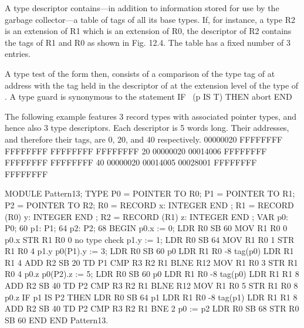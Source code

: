 A type descriptor contains---in addition to information stored for use by the garbage collector---a table of tags of all its base types. If, for instance, a type R2 is an extension of R1 which is an extension of R0, the descriptor of R2 contains the tags of R1 and R0 as shown in Fig. 12.4. The table has a fixed number of 3 entries.

A type test of the form  then, consists of a comparison of the type tag of  at address  with the tag held in the descriptor of  at the extension level of the type of . A type guard  is synonymous to the statement
\begintt
IF ~(p IS T) THEN abort END
\endtt


\noindent The following example features 3 record types with associated pointer types, and hence also 3 type descriptors. Each descriptor is 5 words long. Their addresses, and therefore their tags, are 0, 20, and 40 respectively.
 00000020 FFFFFFFF FFFFFFFF FFFFFFFF FFFFFFFF
    20 00000020 00014006 FFFFFFFF FFFFFFFF FFFFFFFF
    40 00000020 00014005 00028001 FFFFFFFF FFFFFFFF

MODULE Pattern13;
  TYPE
    P0 = POINTER TO R0;
    P1 = POINTER TO R1;
    P2 = POINTER TO R2;
    R0 = RECORD x: INTEGER END ;
    R1 = RECORD (R0) y: INTEGER END ;
    R2 = RECORD (R1) z: INTEGER END ;
  VAR
    p0: P0;                      60
    p1: P1;                      64
    p2: P2;                      68
  BEGIN
    p0.x := 0;         LDR  R0 SB 60
                       MOV  R1 R0 0      p0.x
                       STR  R1 R0 0      no type check
    p1.y := 1;         LDR  R0 SB 64
                       MOV  R1 R0 1
                       STR  R1 R0 4      p1.y
    p0(P1).y := 3;     LDR  R0 SB 60     p0
                       LDR  R1 R0 -8     tag(p0)
                       LDR  R1 R1 4      
                       ADD  R2 SB 20     TD P1
                       CMP  R3 R2 R1     
                       BLNE R12
                       MOV  R1 R0 3
                       STR  R1 R0 4      p0.z
    p0(P2).z := 5;     LDR  R0 SB 60     p0
                       LDR  R1 R0 -8     tag(p0)
                       LDR  R1 R1 8
                       ADD  R2 SB 40     TD P2
                       CMP  R3 R2 R1
                       BLNE R12
                       MOV  R1 R0 5
                       STR  R1 R0 8      p0.z
    IF p1 IS P2 THEN   LDR  R0 SB 64     p1
                       LDR  R1 R0 -8     tag(p1)
                       LDR  R1 R1 8      
                       ADD  R2 SB 40     TD P2
                       CMP  R3 R2 R1
                       BNE  2
      p0 := p2         LDR  R0 SB 68
                       STR  R0 SB 60
  END
END Pattern13.
\endtt

